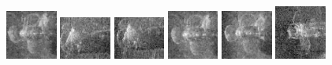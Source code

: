 \begin{figure}
    \centering
    \includegraphics[width=0.15\textwidth]{chapters/images/dataset/all-class-images/propeler/propeler-91.jpg}
    \includegraphics[width=0.15\textwidth]{chapters/images/dataset/all-class-images/propeler/propeler-110.jpg}
    \includegraphics[width=0.15\textwidth]{chapters/images/dataset/all-class-images/propeler/propeler-113.jpg}
    \includegraphics[width=0.15\textwidth]{chapters/images/dataset/all-class-images/propeler/propeler-92.jpg}
    \includegraphics[width=0.15\textwidth]{chapters/images/dataset/all-class-images/propeler/propeler-78.jpg}
    \includegraphics[width=0.15\textwidth]{chapters/images/dataset/all-class-images/propeler/propeler-6.jpg}
    

\end{figure}
